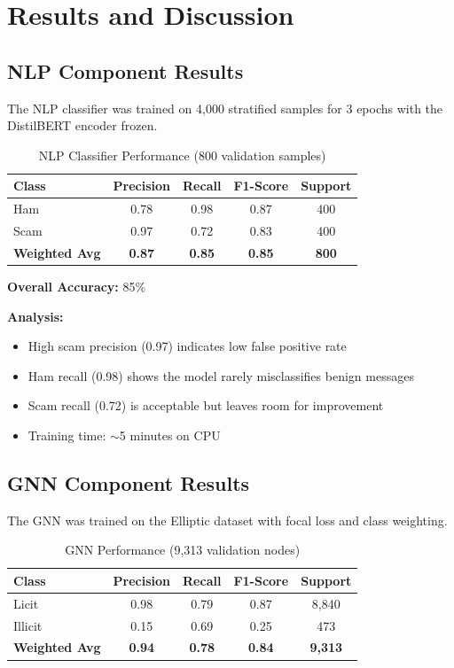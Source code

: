 \section{Results and Discussion}

\subsection{NLP Component Results}

The NLP classifier was trained on 4,000 stratified samples for 3 epochs with the DistilBERT encoder frozen.

\begin{table}[h]
\centering
\caption{NLP Classifier Performance (800 validation samples)}
\label{tab:nlp_results}
\begin{tabular}{lcccc}
\toprule
\textbf{Class} & \textbf{Precision} & \textbf{Recall} & \textbf{F1-Score} & \textbf{Support} \\
\midrule
Ham & 0.78 & 0.98 & 0.87 & 400 \\
Scam & 0.97 & 0.72 & 0.83 & 400 \\
\midrule
\textbf{Weighted Avg} & \textbf{0.87} & \textbf{0.85} & \textbf{0.85} & \textbf{800} \\
\bottomrule
\end{tabular}
\end{table}

\textbf{Overall Accuracy:} 85\%

\textbf{Analysis:}
\begin{itemize}
    \item High scam precision (0.97) indicates low false positive rate
    \item Ham recall (0.98) shows the model rarely misclassifies benign messages
    \item Scam recall (0.72) is acceptable but leaves room for improvement
    \item Training time: $\sim$5 minutes on CPU
\end{itemize}

\subsection{GNN Component Results}

The GNN was trained on the Elliptic dataset with focal loss and class weighting.

\begin{table}[h]
\centering
\caption{GNN Performance (9,313 validation nodes)}
\label{tab:gnn_results}
\begin{tabular}{lcccc}
\toprule
\textbf{Class} & \textbf{Precision} & \textbf{Recall} & \textbf{F1-Score} & \textbf{Support} \\
\midrule
Licit & 0.98 & 0.79 & 0.87 & 8,840 \\
Illicit & 0.15 & 0.69 & 0.25 & 473 \\
\midrule
\textbf{Weighted Avg} & \textbf{0.94} & \textbf{0.78} & \textbf{0.84} & \textbf{9,313} \\
\bottomrule
\end{tabular}
\end{table}

